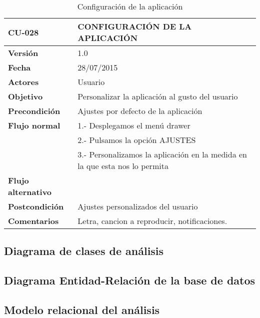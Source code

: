 \documentclass[../pfc.tex]{subfiles}
\begin{document}
	\begin{table}[H]
		\centering
		\begin{tabular}[t]{|p{3cm}|p{9.5cm}|}
			\hline \textbf{CU-028} & \textbf{CONFIGURACIÓN DE LA APLICACIÓN} \\*
			\hline\hline \textbf{Versión} & 1.0 \\*
			\hline\hline \textbf{Fecha} & 28/07/2015 \\*
			\hline\textbf{Actores} 	& Usuario\\*
			\hline \textbf{Objetivo} & Personalizar la aplicación al gusto del usuario\\* 			
			\hline \textbf{Precondición} & Ajustes por defecto de la aplicación\\* 
			\hline \textbf{Flujo normal} & 1.- Desplegamos el menú drawer \\* 
			& 2.- Pulsamos la opción AJUSTES\\*	
			& 3.- Personalizamos la aplicación en la medida en la que esta nos lo permita\\*	
			\hline \textbf{Flujo alternativo} & \\* 
			\hline \textbf{Postcondición} & Ajustes personalizados del usuario\\* 
			\hline \textbf{Comentarios}   & Letra, cancion a reproducir, notificaciones.\\*
			\hline
		\end{tabular}
		\caption{Configuración de la aplicación}
		\label{tabla:caso036}
	\end{table}
			


	
	\subsection{Diagrama de clases de análisis}
		
	\subsection{Diagrama Entidad-Relación de la base de datos}
		
	\subsection{Modelo relacional del análisis}
	
\end{document}
